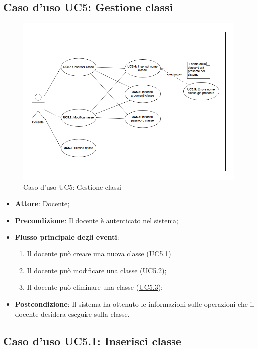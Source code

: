 \documentclass[12pt,a4paper]{article}
\begin{document}
\subsection{Caso d'uso UC5: Gestione classi}
\begin{figure}[H]
	\centering
	\includegraphics[width=\textwidth]{diagramUC5.png}
	\caption{Caso d'uso UC5: Gestione classi}\label{fig:UC5} 
\end{figure}
\begin{itemize}

\item \textbf{Attore}: Docente; 
\item \textbf{Precondizione}: Il docente è autenticato nel sistema;

\item \textbf{Flusso principale degli eventi}:
\begin{enumerate}
	\item Il docente può creare una nuova classe (\hyperlink{UC5.1}{UC5.1});
	\item Il docente può modificare una classe (\hyperlink{UC5.2}{UC5.2});
	\item Il docente può eliminare una classe (\hyperlink{UC5.3}{UC5.3});
	
\end{enumerate}
\item \textbf{Postcondizione}: Il sistema ha ottenuto le informazioni sulle operazioni che il docente desidera eseguire sulla classe.
\end{itemize}
\hypertarget{UC5.1}{}
\subsection{Caso d'uso UC5.1: Inserisci classe}
\end{document}
